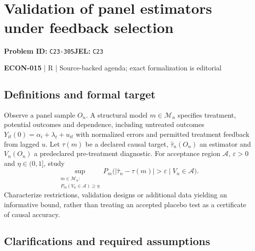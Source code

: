 \documentclass[11pt,a4paper]{article}
\begin{document}
\section*{Validation of panel estimators under feedback selection}
\textbf{Problem ID:} \texttt{C23-305}\quad \textbf{JEL:} \texttt{C23}\par
\label{problem:OP-0600}


\label{audited:ECON-015}

{\sffamily\small\color{muted}\textbf{ECON-015} | R | Source-backed agenda; exact formalization is editorial\par}

\subsection*{Definitions and formal target}

Observe a panel sample \(O_n\). A structural model \(m\in\mathcal M_n\) specifies treatment, potential outcomes and dependence, including untreated outcomes \(Y_{it}(0)=\alpha_i+\lambda_t+u_{it}\) with normalized errors and permitted treatment feedback from lagged \(u\). Let \(\tau(m)\) be a declared causal target, \(\widehat\tau_n(O_n)\) an estimator and \(V_n(O_n)\) a predeclared pre-treatment diagnostic. For acceptance region \(\mathcal A\), \(\varepsilon>0\) and \(\eta\in(0,1]\), study
\[
 \sup_{\substack{m\in\mathcal M_n:\\P_m(V_n\in\mathcal A)\geq\eta}}
 P_m\bigl(|\widehat\tau_n-\tau(m)|>\varepsilon\mid V_n\in\mathcal A\bigr).
\]
Characterize restrictions, validation designs or additional data yielding an informative bound, rather than treating an accepted placebo test as a certificate of causal accuracy.

\subsection*{Clarifications and required assumptions}
\end{document}
